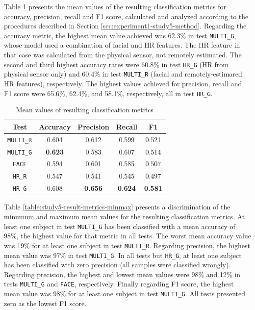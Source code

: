 Table \ref{table:study5-result-metrics-mean} presents the mean values of the resulting classification metrics for accuracy, precision, recall and F1 score, calculated and analyzed according to the procedures described in Section \ref{sec:experiment1-study5-method}. Regarding the accuracy metric, the highest mean value achieved was 62.3\% in test \texttt{MULTI\_G}, whose model used a combination of facial and HR features. The HR feature in that case was calculated from the physical sensor, not remotely estimated. The second and third highest accuracy rates were 60.8\% in test \texttt{HR\_G} (HR from physical sensor only) and 60.4\% in test \texttt{MULTI\_R} (facial and remotely-estimared HR features), respectively. The highest values achieved for precision, recall and F1 score were 65.6\%, 62.4\%, and 58.1\%, respectively, all in test \texttt{HR\_G}.

\begin{table}
    \centering
    \caption{Mean values of resulting classification metrics}
    \label{table:study5-result-metrics-mean}
    \begin{tabular}[l]{@{}ccccc}
        \toprule%
            \textbf{Test} & \textbf{Accuracy} & \textbf{Precision} & \textbf{Recall} & \textbf{F1}\\
        \midrule%
            \texttt{MULTI\_R} & 0.604 & 0.612 & 0.599 & 0.521 \\ %
            \texttt{MULTI\_G} & \textbf{0.623} & 0.583 & 0.607 & 0.514 \\ %
            \texttt{FACE} & 0.594 & 0.601 & 0.585 & 0.507 \\ %
            \texttt{HR\_R} & 0.547 & 0.541 & 0.545 & 0.497 \\ %
            \texttt{HR\_G} & 0.608 & \textbf{0.656} & \textbf{0.624} & \textbf{0.581} \\ %
        \bottomrule%
    \end{tabular}
\end{table}

Table \ref{table:study5-result-metrics-minmax} presents a discrimination of the minumum and maximum mean values for the resulting classification metrics. At least one subject in test \texttt{MULTI\_G} has been classified with a mean accuracy of 98\%, the highest value for that metric in all tests. The worst mean accuracy value was 19\% for at least one subject in test \texttt{MULTI\_R}. Regarding precision, the highest mean value was 97\% in test \texttt{MULTI\_G}. In all tests but \texttt{HR\_G}, at least one subject has been classified with zero precision (all samples were classified wrongly). Regarding precision, the highest and lowest mean values were 98\% and 12\% in tests \texttt{MULTI\_G} and \texttt{FACE}, respectively. Finally regarding F1 score, the highest mean value was 98\% for at least one subject in test \texttt{MULTI\_G}. All tests presented zero as the lowest F1 score.

